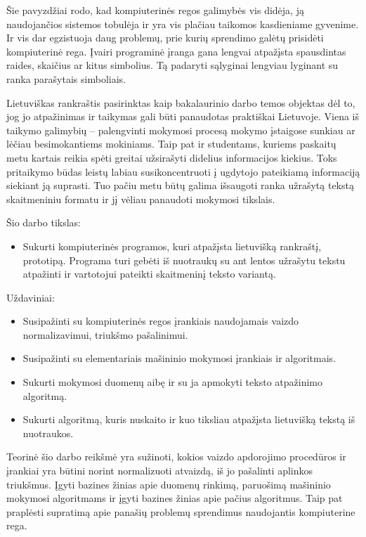 \documentclass[a4paper,12pt]{article}
\begin{document}
Šie pavyzdžiai rodo, kad kompiuterinės regos galimybės vis didėja, ją naudojančios sistemos tobulėja ir yra vis plačiau taikomos kasdieniame gyvenime. Ir vis dar egzistuoja daug problemų, prie kurių sprendimo galėtų prisidėti kompiuterinė rega. Įvairi programinė įranga gana lengvai atpažįsta spausdintas raides, skaičius ar kitus simbolius. Tą padaryti sąlyginai lengviau lyginant su ranka parašytais simboliais.

Lietuviškas rankraštis pasirinktas kaip bakalaurinio darbo temos objektas dėl to, jog jo atpažinimas ir taikymas gali būti panaudotas praktiškai Lietuvoje. Viena iš taikymo galimybių – palengvinti mokymosi procesą mokymo įstaigose sunkiau ar lėčiau besimokantiems mokiniams. Taip pat ir studentams, kuriems paskaitų metu kartais reikia spėti greitai užsirašyti didelius informacijos kiekius. Toks pritaikymo būdas leistų labiau susikoncentruoti į ugdytojo pateikiamą informaciją siekiant ją suprasti. Tuo pačiu metu būtų galima išsaugoti ranka užrašytą tekstą skaitmeniniu formatu ir jį vėliau panaudoti mokymosi tikslais.

Šio darbo tikslas:
\begin{itemize}
	\item Sukurti kompiuterinės programos, kuri atpažįsta lietuvišką rankraštį, prototipą. Programa turi gebėti iš nuotraukų su ant lentos užrašytu tekstu atpažinti ir vartotojui pateikti skaitmeninį teksto variantą.
\end{itemize}

Uždaviniai:
\begin{itemize}
	\item Susipažinti su kompiuterinės regos įrankiais naudojamais vaizdo normalizavimui, triukšmo pašalinimui.
	\item Susipažinti su elementariais mašininio mokymosi įrankiais ir algoritmais.
	\item Sukurti mokymosi duomenų aibę ir su ja apmokyti teksto atpažinimo algoritmą.
	\item Sukurti algoritmą, kuris nuskaito ir kuo tiksliau atpažįsta lietuvišką tekstą iš nuotraukos.
\end{itemize}

Teorinė šio darbo reikšmė yra sužinoti, kokios vaizdo apdorojimo procedūros ir įrankiai yra būtini norint normalizuoti atvaizdą, iš jo pašalinti aplinkos triukšmus. Įgyti bazines žinias apie duomenų rinkimą, paruošimą mašininio mokymosi algoritmams ir įgyti bazines žinias apie pačius algoritmus. Taip pat praplėsti supratimą apie panašių problemų sprendimus naudojantis kompiuterine rega.
\end{document}
